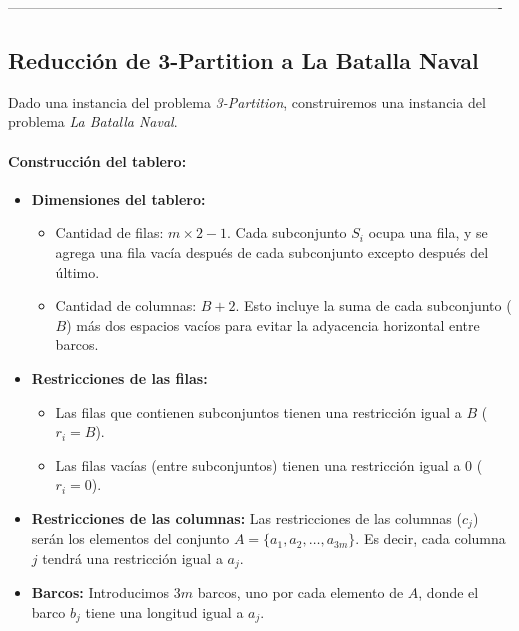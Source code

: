 ----------------------------------------------------------------------------------------------------------

\subsection*{Reducción de 3-Partition a La Batalla Naval}

Dado una instancia del problema \textit{3-Partition}, construiremos una instancia del problema \textit{La Batalla Naval}.

\paragraph{Construcción del tablero:}

\begin{itemize}
    \item \textbf{Dimensiones del tablero:}
    \begin{itemize}
        \item Cantidad de filas: \(m \times 2 - 1\). Cada subconjunto \(S_i\) ocupa una fila, y se agrega una fila vacía después de cada subconjunto excepto después del último.
        \item Cantidad de columnas: \(B + 2\). Esto incluye la suma de cada subconjunto (\(B\)) más dos espacios vacíos para evitar la adyacencia horizontal entre barcos.
    \end{itemize}

    \item \textbf{Restricciones de las filas:}
    \begin{itemize}
        \item Las filas que contienen subconjuntos tienen una restricción igual a \(B\) (\(r_i = B\)).
        \item Las filas vacías (entre subconjuntos) tienen una restricción igual a 0 (\(r_i = 0\)).
    \end{itemize}

    \item \textbf{Restricciones de las columnas:}
    Las restricciones de las columnas (\(c_j\)) serán los elementos del conjunto \(A = \{a_1, a_2, \dots, a_{3m}\}\). Es decir, cada columna \(j\) tendrá una restricción igual a \(a_j\).

    \item \textbf{Barcos:}
    Introducimos \(3m\) barcos, uno por cada elemento de \(A\), donde el barco \(b_j\) tiene una longitud igual a \(a_j\).
\end{itemize}

